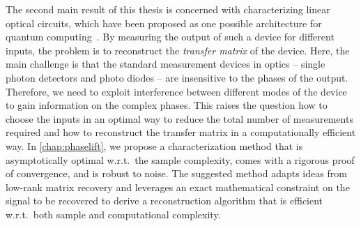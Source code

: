The second main result of this thesis is concerned with characterizing linear optical circuits, which have been proposed as one possible architecture for quantum computing~\cite{}.
By measuring the output of such a device for different inputs, the problem is to reconstruct the \emph{transfer matrix} of the device.
Here, the main challenge is that the standard measurement devices in optics -- single photon detectors and photo diodes -- are insensitive to the phases of the output.
Therefore, we need to exploit interference between different modes of the device to gain information on the complex phases.
This raises the question how to choose the inputs in an optimal way to reduce the total number of measurements required and how to reconstruct the transfer matrix in a computationally efficient way.
In \cref{chap:phaselift}, we propose a characterization method that is asymptotically optimal w.r.t.\ the sample complexity, comes with a rigorous proof of convergence, and is robust to noise.
The suggested method adapts ideas from low-rank matrix recovery and leverages an exact mathematical constraint on the signal to be recovered to derive a reconstruction algorithm that is efficient w.r.t.\ both sample and computational complexity.

